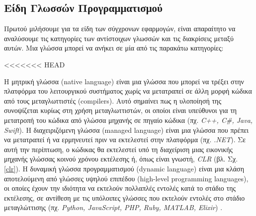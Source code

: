 \subsection{Είδη Γλωσσών Προγραμματισμού}
Πρωτού μιλήσουμε για τα είδη των σύγχρονων εφαρμογών, είναι απαραίτητο να αναλύσουμε τις κατηγορίες των αντίστοιχων γλωσσών και τις διακρίσεις μεταξύ αυτών. Μια γλώσσα μπορεί να ανήκει σε μία από τις παρακάτω κατηγορίες:
\begin{description}[font=$\bullet$~\normalfont\color{black}]
\item [Μετταγλωτισμένες ή Μητρικές γλώσσες (\selectlanguage{english}Compiled or Native Languages)]
\item [Διαχειριζόμενες Γλώσσες (\selectlanguage{english}Managed Languages)]
\item [Δυναμικές Γλώσσες (\selectlanguage{english}Dynamic Languages)]
<<<<<<< HEAD
\end{description}Η μητρική γλώσσα (native language) είναι μια γλώσσα που μπορεί να τρέξει στην πλατφόρμα του λειτουργικού συστήματος χωρίς να μετατραπεί σε άλλη μορφή κώδικα από τους μεταγλωττιστές (compilers). Αυτό σημαίνει πως η υλοποίησή της συνοψίζεται κυρίως στη χρήση μεταγλωττιστών, οι οποίοι είναι υπεύθυνοι για τη μετατροπή του κώδικα από γλώσσα μηχανής σε πηγαίο κώδικα (πχ. \textit{C++, C\#, Java, Swift}). Η διαχειριζόμενη γλώσσα (managed language) είναι μια γλώσσα που πρέπει να μετατραπεί ή να ερμηνευτεί πριν να εκτελεστεί στην πλατφόρμα (πχ. \textit{.NET}). Σε αυτή την περίπτωση, ο κώδικας θα εκτελεστεί υπό τη διαχείριση μιας εικονικής μηχανής γλώσσας κοινού χρόνου εκτέλεσης ή, όπως είναι γνωστή, \textit{CLR} \cite{[STR+09],[DEV+03]} (βλ. Σχ. \ref{clr}). Η δυναμική γλώσσα προγραμματισμού (dynamic language) είναι μια κλάση αποτελούμενη από γλώσσες υψηλού επιπέδου (high-level programming languages), οι οποίες έχουν την ιδιότητα να εκτελούν πολλαπλές εντολές κατά το στάδιο της εκτέλεσης, σε αντίθεση με τις υπόλοιπες γλώσσες που εκτελούν εντολές στο στάδιο μεταγλώττισης  (πχ. \textit{Python, JavaScript, PHP, Ruby, MATLAB, Elixir}) \cite{[MIC05], [ADV09]}.

